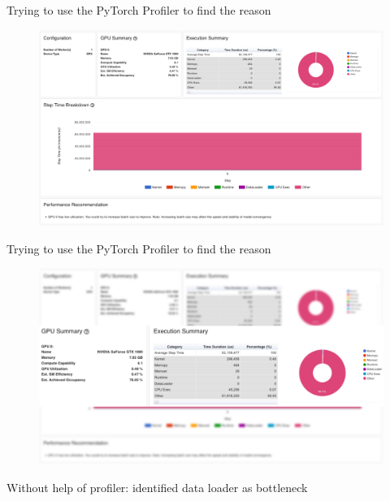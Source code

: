 \documentclass[compress,aspectratio=169]{beamer}
\begin{document}
\begin{frame}{Trying to use the PyTorch Profiler to find the reason}
    \begin{center}
    \begin{figure}
        \includegraphics[width=1\textwidth]{../../data/scap_gtx1080_profiler-torch_sample-points_14628864}
    \end{figure}
    \end{center}
\end{frame}

\begin{frame}{Trying to use the PyTorch Profiler to find the reason}
    \begin{center}
    \begin{figure}
        \includegraphics[width=1\textwidth]{../../data/scap_gtx1080_profiler-torch_sample-points_14628864_zoom}
    \end{figure}
    \end{center}
\end{frame}

\begin{frame}{Without help of profiler: identified data loader as bottleneck}
    
\end{frame}
\end{document}
